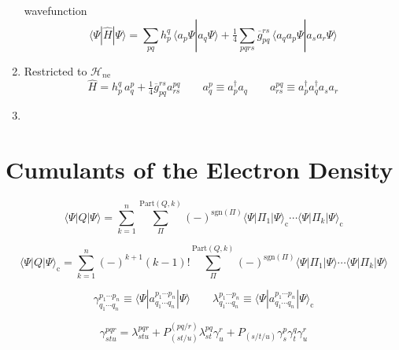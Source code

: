 \begin{enumerate}
        wavefunction
        \begin{equation}
            \langle\Psi|\hat{H}|\Psi\rangle
            =
            \sum_{pq}
            h_p^q\,
            \langle a_p\Psi| a_q\Psi\rangle
            +
            \tfrac{1}{4}
            \sum_{pqrs}
            \overline{g}_{pq}^{rs}\,
            \langle a_q a_p\Psi| a_s a_r\Psi\rangle
        \end{equation}
    \item
        Restricted to \(\mathcal{H}_{n\mathrm{e}}\)
        \begin{equation}
            \hat{H}
            =
            h_p^q\,
            a^p_q
            +
            \tfrac{1}{4}
            \overline{g}_{pq}^{rs}
            a^{pq}_{rs}
            \qquad
            a^p_q
            \equiv
            a_p^\dagger a_q
            \qquad
            a^{pq}_{rs}
            \equiv
            a_p^\dagger a_q^\dagger a_s a_r
        \end{equation}
    \item
\end{enumerate}


\section{Cumulants of the Electron Density}

\begin{equation}
    \langle\Psi|Q|\Psi\rangle
    =
    \sum_{k=1}^n
    \sum_{\Pi}^{\mathrm{Part}(Q, k)}
    (-)^{\mathrm{sgn}(\Pi)}
    \langle\Psi|\Pi_1|\Psi\rangle_\mathrm{c}
    \cdots
    \langle\Psi|\Pi_k|\Psi\rangle_\mathrm{c}
\end{equation}

\begin{equation}
    \langle\Psi|Q|\Psi\rangle_\mathrm{c}
    =
    \sum_{k=1}^n
    (-)^{k+1}
    (k-1)!
    \sum_{\Pi}^{\mathrm{Part}(Q, k)}
    (-)^{\mathrm{sgn}(\Pi)}
    \langle\Psi|\Pi_1|\Psi\rangle
    \cdots
    \langle\Psi|\Pi_k|\Psi\rangle
\end{equation}

\begin{equation}
    \gamma^{p_1\cdots p_n}_{q_1\cdots q_n}
    \equiv
    \langle\Psi|a^{p_1\cdots p_n}_{q_1\cdots q_n}|\Psi\rangle
    \qquad
    \lambda^{p_1\cdots p_n}_{q_1\cdots q_n}
    \equiv
    \langle\Psi|a^{p_1\cdots p_n}_{q_1\cdots q_n}|\Psi\rangle_\mathrm{c}
\end{equation}

\begin{equation}
    \gamma^{pqr}_{stu}
    =
    \lambda^{pqr}_{stu}
    +
    P^{(pq/r)}_{(st/u)}
    \lambda^{pq}_{st}
    \gamma^r_u
    +
    P_{(s/t/u)}
    \gamma^p_s
    \gamma^q_t
    \gamma^r_u
\end{equation}

